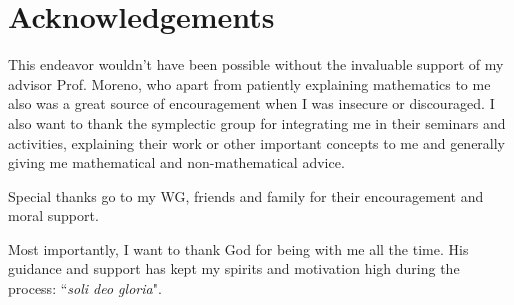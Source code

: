 \section*{Acknowledgements}

This endeavor wouldn't have been possible without the invaluable support of my advisor Prof. Moreno, who apart from patiently explaining mathematics to me
also was a great source of encouragement when I was insecure or discouraged.
I also want to thank the symplectic group for integrating me in their seminars and activities, explaining their work or other important concepts to me
and generally giving me mathematical and non-mathematical advice.

Special thanks go to my WG, friends and family for their encouragement and moral support. 

Most importantly, I want to thank God for being with me all the time. 
His guidance and support has kept my spirits and motivation high during the process:
``\textit{soli deo gloria}".